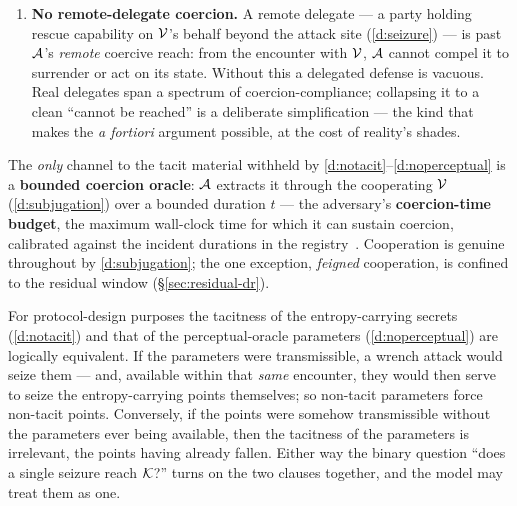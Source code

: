 \begin{assumption}
\begin{enumerate}[nosep,leftmargin=2.4em,start=0,label=\textbf{D\arabic*.},ref=D\arabic*]
        has nothing to dictate (Assumption~\ref{ass:tkba}).
  \item\label{d:nodelegatecoerce} \textbf{No remote-delegate coercion.} A remote
        delegate --- a party holding rescue capability on $\mathcal{V}$'s behalf beyond
        the attack site (\ref{d:seizure}) --- is past $\mathcal{A}$'s \emph{remote}
        coercive reach: from the encounter with $\mathcal{V}$, $\mathcal{A}$ cannot compel
        it to surrender or act on its state. Without this a delegated defense is
        vacuous. Real delegates span a spectrum of coercion-compliance; collapsing it
        to a clean ``cannot be reached'' is a deliberate simplification --- the kind
        that makes the \emph{a fortiori} argument possible, at the cost of reality's
        shades.
\end{enumerate}
The \emph{only} channel to the tacit material withheld by \ref{d:notacit}--\ref{d:noperceptual} is a
\textbf{bounded coercion oracle}: $\mathcal{A}$ extracts it through the cooperating
$\mathcal{V}$ (\ref{d:subjugation}) over a bounded duration $t$ --- the adversary's
\textbf{coercion-time budget}, the maximum wall-clock time for which it can sustain coercion,
calibrated against the incident durations in the registry~\cite{lopp-attacks}.
Cooperation is genuine throughout by \ref{d:subjugation}; the one exception, \emph{feigned}
cooperation, is confined to the residual window (\S\ref{sec:residual-dr}).
\end{assumption}

\begin{remark}\label{rem:tacit-coincide}
For protocol-design purposes the tacitness of the entropy-carrying secrets
(\ref{d:notacit}) and that of the perceptual-oracle parameters
(\ref{d:noperceptual}) are logically equivalent. If the parameters were
transmissible, a wrench attack would seize them --- and, available within that
\emph{same} encounter, they would then serve to seize the entropy-carrying points
themselves; so non-tacit parameters force non-tacit points. Conversely, if the
points were somehow transmissible without the parameters ever being available,
then the tacitness of the parameters is irrelevant, the points having already
fallen. Either way the binary question ``does a single seizure reach $\mathcal{K}$?'' turns
on the two clauses together, and the model may treat them as one.
\end{remark}

